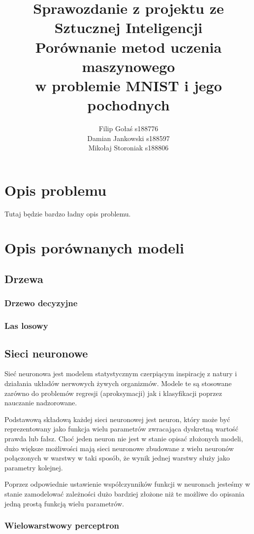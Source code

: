 \documentclass{article}
\title{Sprawozdanie z projektu ze Sztucznej Inteligencji \\ 
Porównanie metod uczenia maszynowego \\ 
w problemie MNIST i jego pochodnych}
\author{Filip Gołaś s188776 \\ Damian Jankowski s188597 \\ Mikołaj Storoniak s188806}
\begin{document}
\maketitle

\section{Opis problemu}

Tutaj będzie bardzo ładny opis problemu.

\section{Opis porównanych modeli}

\subsection{Drzewa}
\subsubsection{Drzewo decyzyjne}
\subsubsection{Las losowy}

\subsection{Sieci neuronowe}
Sieć neuronowa jest modelem statystycznym czerpiącym inspirację z natury i 
działania układów nerwowych żywych organizmów.
Modele te są stosowane zarówno do problemów regresji (aproksymacji) jak i klasyfikacji poprzez nauczanie nadzorowane.

Podstawową składową każdej sieci neuronowej jest neuron, który może być reprezentowany 
jako funkcja wielu parametrów zwracająca dyskretną wartość
prawda lub fałsz. Choć jeden neuron nie jest w stanie opisać złożonych modeli, 
dużo większe możliwości mają sieci neuronowe zbudowane z wielu neuronów
połączonych w warstwy w taki sposób, że wynik jednej warstwy służy jako parametry kolejnej.


Poprzez odpowiednie ustawienie współczynników funkcji w neuronach jesteśmy w 
stanie zamodelować zależności dużo bardziej złożone niż te możliwe do opisania jedną
prostą funkcją wielu parametrów.

\subsubsection{Wielowarstwowy perceptron}
\end{document}
